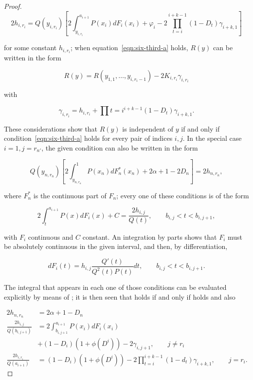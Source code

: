 \documentclass{article}
\theoremstyle{remark}
\begin{document}
\begin{proof}
\begin{equation}
 2h_{i,r_i} = Q(y_{i,r_i}) \left [ 2 \int_{y_{i,r_i}}^{a_{i+1}} P(x_i) dF_i(x_i)
+ \varphi_i - 2 \prod_{t=i}^{i+k-1} (1-D_t) \gamma_{i+k, 1} \right ] \label{eqn:six-third-a}
\end{equation}

for some constant $h_{i,r_i}$; when equation~\ref{eqn:six-third-a} holds, $R(y)$
can be written in the form

\begin{equation}
R(y) = R(y_{1,1}, \dots, y_{i, r_i - 1}) - 2K_{i, r_i} \gamma_{i, r_i}
\label{eqn:six-third-b}
\end{equation}

with

\begin{equation}
\gamma_{i, r_i} = h_{i, r_i} + \prod{t=i}^{i+k-1} (1-D_t) \gamma_{i+k, 1}.
\label{eqn:six-three}
\end{equation}

These considerations show that $R(y)$ is independent of $y$ if and only if
condition~\ref{eqn:six-third-a} holds for every pair of indices $i, j$.  In the
special case $i=1, j=r_{n'}$, the given condition can also be written in the
form

\[
Q(y_{n,r_n}) \left [ 2 \int_{y_{n,r_n}}^{1} P(x_n) dF_n^*(x_n)
+ 2 \alpha + 1 - 2 D_n \right ] = 2h_{n,r_n},
\]

where $F_n^*$ is the continuous part of $F_n$; every one of these conditions is
of the form

\[
2 \int_{t}^{a_{i+1}} P(x) dF_i(x) + C = \frac{2h_{i, j}}{Q(t)},
\qquad b_{i,j} < t < b_{i, j+1},
\]

with $F_i$ continuous and $C$ constant. An integration by parts shows that
$F_i$ must be absolutely continuous in the given interval, and then, by
differentiation,

\begin{equation}
dF_i(t) = h_{i,j} \frac{Q'(t)}{Q^2(t) P(t)} dt, \qquad b_{i,j} < t < b_{i, j+1}.
\label{eqn:six-third-c}
\end{equation}

The integral that appears in each one of those conditions
\label{eqn:six-third-a} can be evaluated explicitly by means of
\label{eqn:six-third-c}; it is then seen that \label{eqn:six-third-a} holds if
and only if \label{eqn:six-third-c} holds and also

\begin{equation}
\begin{split}
2h_{n, r_n} &= 2\alpha + 1 - D_n \\
\frac{2h_{i,j}}{Q(b_{i, j+1})} &= 2 \int_{b_{i, j+1}}^{a_{i+1}} P(x_i) dF_i(x_i) \\
&+ (1-D_i)(1 + \phi(D^i)) - 2 \gamma_{i, j+1}, \qquad j \neq r_i  \\
\frac{2h_{i,r_i}}{Q(a_{i+1})} &=
(1-D_i)(1 + \phi(D^i)) - 2 \prod_{t=i}^{i+k-1} (1-d_t) \gamma_{i+k, 1}, \qquad j
= r_i.
\end{split}
\label{eqn:six-d}
\end{equation}


\end{proof}
\end{document}
